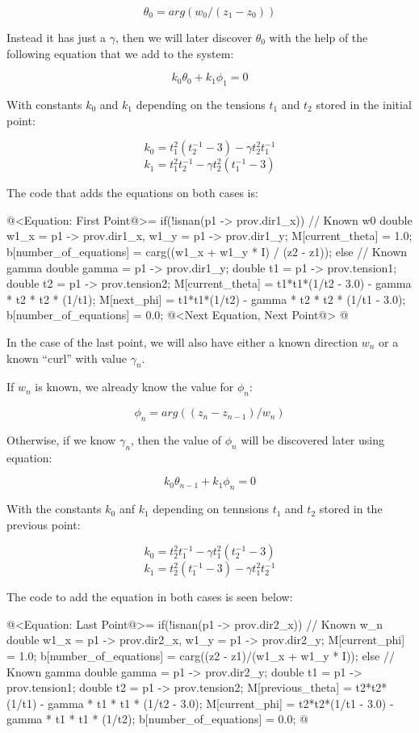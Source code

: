 $$
\theta_0 = arg(w_0/(z_1-z_0))
$$


Instead it has just a $\gamma$, then we will later discover $\theta_0$
with the help of the following equation that we add to the system:

$$
k_0\theta_0+k_1\phi_1=0
$$

With constants $k_0$ and $k_1$ depending on the tensions $t_1$ and
$t_2$ stored in the initial point:

$$
k_0=t_1^2(t_2^{-1}-3)-\gamma t_2^2t_1^{-1}
$$
$$
k_1=t_1^2t_2^{-1}-\gamma t_2^2(t_1^{-1}-3)
$$

The code that adds the equations on both cases is:

\iniciocodigo
@<Equation: First Point@>=
if(!isnan(p1 -> prov.dir1_x)){ // Known w0
  double w1_x = p1 -> prov.dir1_x, w1_y = p1 -> prov.dir1_y;
  M[current_theta] = 1.0;
  b[number_of_equations] = carg((w1_x + w1_y * I) / (z2 - z1));
}
else{ // Known gamma
  double gamma = p1 -> prov.dir1_y;
  double t1 = p1 -> prov.tension1;
  double t2 = p1 -> prov.tension2;
  M[current_theta] = t1*t1*(1/t2 - 3.0) - gamma * t2 * t2 * (1/t1);
  M[next_phi] = t1*t1*(1/t2) - gamma * t2 * t2 * (1/t1 - 3.0);
  b[number_of_equations] = 0.0;
}
@<Next Equation, Next Point@>
@
\fimcodigo

In the case of the last point, we will also have either a known
direction $w_n$ or a known ``curl'' with value $\gamma_n$.

If $w_n$ is known, we already know the value for $\phi_n$:

$$
\phi_n = arg((z_n - z_{n-1})/w_n)
$$

Otherwise, if we know $\gamma_n$, then the value of $\phi_n$ will be
discovered later using equation:

$$
k_0\theta_{n-1}+k_1\phi_{n}=0
$$

With the constants $k_0$ anf $k_1$ depending on tennsions $t_1$ and
$t_2$ stored in the previous point:

$$
k_0=t_2^2t_1^{-1}-\gamma t_1^2(t_2^{-1}-3)
$$
$$
k_1=t_2^2(t_1^{-1}-3)-\gamma t_1^2t_2^{-1}
$$

The code to add the equation in both cases is seen below:

\iniciocodigo
@<Equation: Last Point@>=
if(!isnan(p1 -> prov.dir2_x)){ // Known w_n 
  double w1_x = p1 -> prov.dir2_x, w1_y = p1 -> prov.dir2_y;
  M[current_phi] = 1.0;
  b[number_of_equations] = carg((z2 - z1)/(w1_x + w1_y * I));
}
else{ // Known gamma
  double gamma = p1 -> prov.dir2_y;
  double t1 = p1 -> prov.tension1;
  double t2 = p1 -> prov.tension2;
  M[previous_theta] = t2*t2*(1/t1) - gamma * t1 * t1 * (1/t2 - 3.0);
  M[current_phi] = t2*t2*(1/t1 - 3.0) - gamma * t1 * t1 * (1/t2);
  b[number_of_equations] = 0.0;
}
@
\fimcodigo

